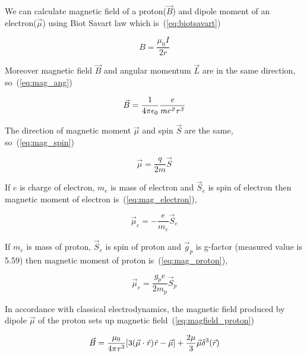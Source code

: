 \documentclass[10pt,conference]{IEEEtran}
\begin{document}
We can calculate magnetic field of a proton($\vec{B}$) and dipole moment of an electron($\vec{\mu}$) using Biot Savart law which is~(\ref{eq:biotsavart})

\begin{equation}
  B=\frac{\mu_{0}I}{2r}
  \label{eq:biotsavart}
\end{equation}

Moreover magnetic field $\vec{B}$ and angular momentum $\vec{L}$ are in the same direction, so~(\ref{eq:mag_ang})

\begin{equation}
 \vec{B}=\frac{1}{4\pi\-\epsilon_{0}}\frac{\mathit{e}}{\mathit{mc^{2}r^{3}}}
 \label{eq:mag_ang}
\end{equation}

The direction of magnetic moment $\vec{\mu}$ and spin $\vec{S}$ are the same, so~(\ref{eq:mag_spin})

\begin{equation}
 \vec{\mu}=\frac{\mathit{q}}{2\mathit{m}}\vec{S}
 \label{eq:mag_spin}
\end{equation}

If $\mathit{e}$ is charge of electron, $\mathit{m_{e}}$ is mass of electron and $\vec{S}_{e}$ is spin of electron then magnetic moment of electron is~(\ref{eq:mag_electron}),

\begin{equation}
 \vec{\mu}_{e}=-\frac{\mathit{e}}{\mathit{m_{e}}}\vec{S}_{e}
 \label{eq:mag_electron}
\end{equation}

If $\mathit{m_{e}}$ is mass of proton, ${\vec{S}}_{e}$ is spin of proton and $\vec{g}_{p}$ is g-factor (measured value is 5.59) then magnetic moment of proton is~(\ref{eq:mag_proton}),

\begin{equation}
 \vec{\mu}_{e}=\frac{\mathit{g}_{p}\mathit{e}}{2\mathit{m}_{p}}\vec{S}_{p}
 \label{eq:mag_proton}
\end{equation}

In accordance with classical electrodynamics, the magnetic field produced by dipole $\vec{\mu}$ of the proton sets up magnetic field~(\ref{eq:magfield_proton})

\begin{equation}
 \vec{B}=\frac{\mathit{\mu}_{0}}{4\mathit{\pi}\-\mathit{r}^{3}}[3(\vec{\mu}\cdot\mathit{\hat{r}})\mathit{\hat{r}}-\vec{\mu}]+\frac{2\mathit{\mu}}{3}\vec{\mu}\mathit{\delta}^{3}(\vec{r})
 \label{eq:magfield_proton}
\end{equation}
\end{document}
